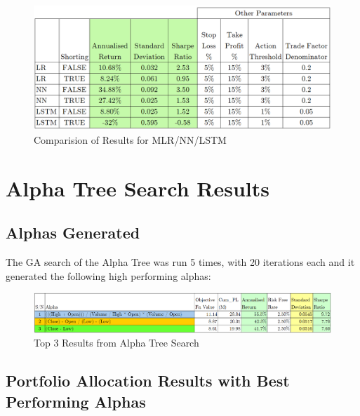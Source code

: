\documentclass[a4paper,12pt]{report}
\numberwithin{equation}{section}
\theoremstyle{definition}
\begin{document}
\begin{figure}[H]
  \centerline{\includegraphics[width=16cm]{ML_results_comparison}}
  \caption{Comparision of Results for MLR/NN/LSTM}
  \label{fig:Comparison of Results}
\end{figure}



\chapter{Alpha Tree Search Results}
\section{Alphas Generated}
The GA search of the Alpha Tree was run 5 times, with 20 iterations each and it generated the following high performing alphas:
\begin{figure}[H]
  \centerline{\includegraphics[width=20cm]{generated_alphas}}
  \caption{Top 3 Results from Alpha Tree Search}
  \label{fig:alphas_generated}
\end{figure}

\section{Portfolio Allocation Results with Best Performing Alphas}
\end{document}
